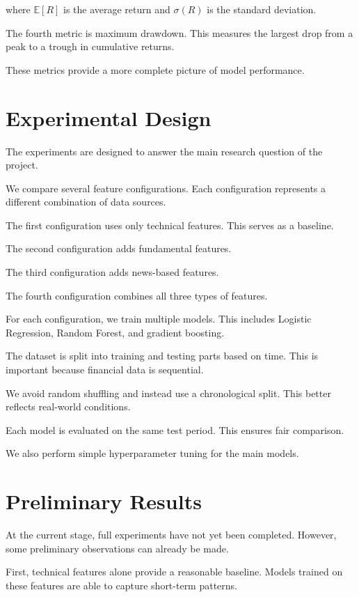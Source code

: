 \documentclass[12pt,a4paper]{article}
\begin{document}
where $\mathbb{E}[R]$ is the average return and $\sigma(R)$ is the standard deviation.

The fourth metric is maximum drawdown. This measures the largest drop from a peak to a trough in cumulative returns.

These metrics provide a more complete picture of model performance.

\section{Experimental Design}

The experiments are designed to answer the main research question of the project.

We compare several feature configurations. Each configuration represents a different combination of data sources.

The first configuration uses only technical features. This serves as a baseline.

The second configuration adds fundamental features.

The third configuration adds news-based features.

The fourth configuration combines all three types of features.

For each configuration, we train multiple models. This includes Logistic Regression, Random Forest, and gradient boosting.

The dataset is split into training and testing parts based on time. This is important because financial data is sequential.

We avoid random shuffling and instead use a chronological split. This better reflects real-world conditions.

Each model is evaluated on the same test period. This ensures fair comparison.

We also perform simple hyperparameter tuning for the main models.

\section{Preliminary Results}

At the current stage, full experiments have not yet been completed. However, some preliminary observations can already be made.

First, technical features alone provide a reasonable baseline. Models trained on these features are able to capture short-term patterns.
\end{document}
